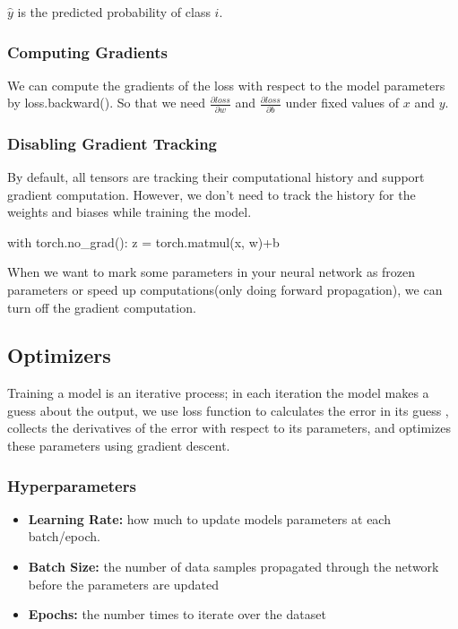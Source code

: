 \documentclass[12pt,hyperref,a4paper,UTF8]{article}
\begin{document}
$\hat{y}$ is the predicted probability of class $i$.\\

\subsubsection{Computing Gradients}
\textbf{} We can compute the gradients of the loss with respect to the model parameters by loss.backward(). So that we need $ \frac{\partial loss}{\partial w}$ and $ \frac{\partial loss}{\partial b}$ under fixed values of $x$ and $y$.

\subsubsection{Disabling Gradient Tracking}
\textbf{} By default, all tensors are tracking their computational history and support gradient computation. However, we don't need to track the history for the weights and biases while training the model.
\begin{python}
    with torch.no_grad():
    z = torch.matmul(x, w)+b
\end{python}

\textbf{} When we want to mark some parameters in your neural network as frozen parameters or speed up computations(only doing forward propagation), we can turn off the gradient computation.

\subsection{Optimizers}
\textbf{}  Training a model is an iterative process; in each iteration the model makes a guess about the output, we use loss function to calculates the error in its guess  , collects the derivatives of the error with respect to its parameters, and optimizes these parameters using gradient descent.

\subsubsection{Hyperparameters}
\begin{itemize}
    \item \textbf{Learning Rate:} how much to update models parameters at each batch/epoch. 
    \item \textbf{Batch Size:} the number of data samples propagated through the network before the parameters are updated
    \item \textbf{Epochs:} the number times to iterate over the dataset
\end{itemize}
\end{document}
